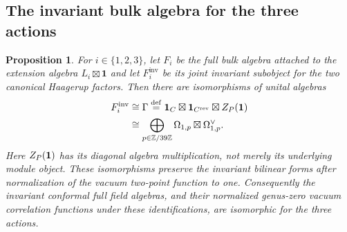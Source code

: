 \documentclass[leqno]{article}
\let\cal\relax
\newcommand{\cal}{\mathcal}
\newcommand{\Z}{\ensuremath{\mathbb{Z}}}
\newcommand{\ov}{\overset}
\newtheorem{prop}[thm]{Proposition}
\numberwithin{equation}{section}
\begin{document}
\subsection{The invariant bulk algebra for the three actions}
\label{subsec:universal-invariant-bulk-algebra}

\begin{prop}
\label{prop:three-invariant-bulk-algebras}
For $i \in \{1,2,3\}$, let $F_i$ be the full bulk algebra attached to the extension algebra $L_i \boxtimes\mathbf1$ and let $F_i^{\mathrm{inv}}$ be its joint invariant subobject for the two canonical Haagerup factors. Then there are isomorphisms of unital algebras
\begin{equation}
\label{eq:universal-invariant-bulk-algebra}
\begin{aligned}
F_i^{\mathrm{inv}} & \cong \Gamma \ov{\mathrm{def}}{=} \mathbf1_{\cal C}\boxtimes\mathbf1_{\cal C^{\mathrm{rev}}}\boxtimes Z_{\cal P}(\mathbf1)\\
& \cong \bigoplus_{p \in \Z/39\Z} \Omega_{1,p}\boxtimes\Omega_{1,p}^{\vee}.
\end{aligned}
\end{equation}
Here $Z_{\cal P}(\mathbf1)$ has its diagonal algebra multiplication, not merely its underlying module object. These isomorphisms preserve the invariant bilinear forms after normalization of the vacuum two-point function to one. Consequently the invariant conformal full field algebras, and their normalized genus-zero vacuum correlation functions under these identifications, are isomorphic for the three actions.
\end{prop}
\end{document}
